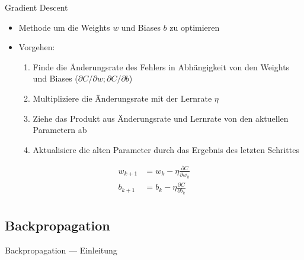 \begin{frame}{Gradient Descent}
  \begin{itemize}
  \item Methode um die Weights \(w\) und Biases \(b\) zu optimieren
  \item Vorgehen: \pause
    \begin{enumerate}
    \item Finde die Änderungsrate des Fehlers in Abhängigkeit von den Weights und Biases (\(\partial C / \partial w; \partial C / \partial b\))\pause
    \item Multipliziere die Änderungsrate mit der Lernrate \(\eta\)\pause
    \item Ziehe das Produkt aus Änderungsrate und Lernrate von den aktuellen Parametern ab\pause
    \item Aktualisiere die alten Parameter durch das Ergebnis des letzten Schrittes
    \end{enumerate}
  \end{itemize}

  \begin{align*}
    w_{k+1} &= w_{k} - \eta \frac{\partial C}{\partial w_{k}}\\[1em]
    b_{k+1} &= b_{k} - \eta \frac{\partial C}{\partial b_{k}}\\
  \end{align*}

\end{frame}

\subsection{Backpropagation}%
\label{sec:backprop}

\begin{frame}{Backpropagation --- Einleitung}


  
\end{frame}

